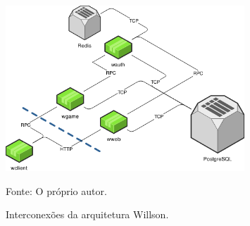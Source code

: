 \begin{figure}[htb!]
  \caption{Interconexões da arquitetura Willson.}
  \label{fig:interconexao_willson}
  \includegraphics[width=0.8\textwidth]{figuras/interconexoes/willson.png}
  \centering

  Fonte: O próprio autor.
\end{figure}

